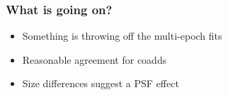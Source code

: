 \documentclass{beamer}
\begin{document}
\frame
{
    \frametitle{What is going on?}

 
    \begin{itemize}

        \item Something is throwing off the multi-epoch fits

        \item Reasonable agreement for coadds
            
        \item Size differences suggest a PSF effect

    \end{itemize}

}
\end{document}
